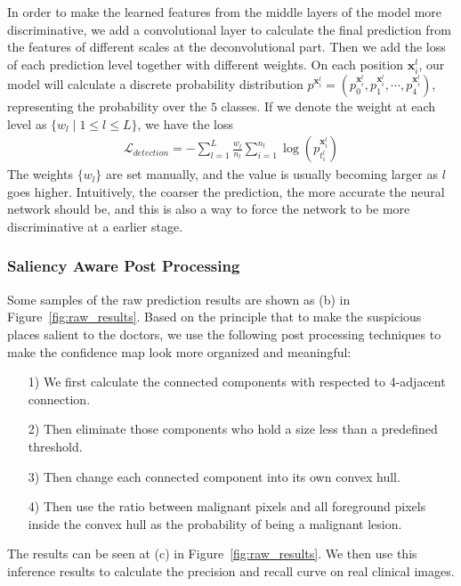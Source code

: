 \documentclass[letterpaper]{article}
\begin{document}
In order to make the learned features from the middle layers of the model more discriminative, we add a convolutional layer to calculate the final prediction from the features of different scales at the deconvolutional part. Then we add the loss of each prediction level together with different weights. On each position $\mathbf{x}^l_i$, our model will calculate a discrete probability distribution $p^{\mathbf{x}^l_i} = (p_0^{\mathbf{x}^l_i}, p_1^{\mathbf{x}^l_i}, \cdots, p_4^{\mathbf{x}^l_i})$, representing the probability over the $5$ classes. If we denote the weight at each level as $\{w_l\mid 1\le l \le L\}$, we have the loss
\begin{align}
  \mathcal{L}_{detection} = -\sum_{l=1}^L \frac{w_l}{n_l} \sum_{i=1}^{n_l} \log{(p_{t_i^l}^{\mathbf{x}^l_i})}
\end{align}
The weights $\{w_l\}$ are set manually, and the value is usually becoming larger as $l$ goes higher. Intuitively, the coarser the prediction, the more accurate the neural network should be, and this is also a way to force the network to be more discriminative at a earlier stage.

\subsubsection{Saliency Aware Post Processing}

Some samples of the raw prediction results are shown as (b) in Figure~\ref{fig:raw_results}. Based on the principle that to make the suspicious places salient to the doctors, we use the following post processing techniques to make the confidence map look more organized and meaningful:
\begin{enumerate}
  \item[1)] We first calculate the connected components with respected to 4-adjacent connection.
  \item[2)] Then eliminate those components who hold a size less than a predefined threshold.
  \item[3)] Then change each connected component into its own convex hull.
  \item[4)] Then use the ratio between malignant pixels and all foreground pixels inside the convex hull as the probability of being a malignant lesion.
\end{enumerate}

The results can be seen at (c) in Figure~\ref{fig:raw_results}. We then use this inference results to calculate the precision and recall curve on real clinical images. 
\end{document}
